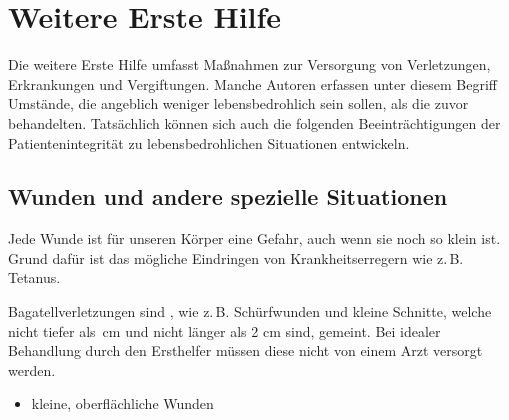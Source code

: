 \section{Weitere Erste Hilfe}

Die weitere Erste Hilfe umfasst Maßnahmen zur Versorgung von
Verletzungen, Erkrankungen und Vergiftungen. Manche Autoren erfassen
unter diesem Begriff Umstände, die
angeblich weniger lebensbedrohlich sein sollen, als die zuvor behandelten. Tatsächlich
können sich auch die folgenden Beeinträchtigungen der
Patientenintegrität zu lebensbedrohlichen Situationen entwickeln. 



\subsection{Wunden und andere spezielle Situationen}
\label{topic:ehi-wunden}


Jede Wunde ist für unseren Körper eine Gefahr, auch wenn sie noch so klein
ist. Grund dafür ist das mögliche Eindringen von Krankheitserregern wie z.\,B.
Tetanus. 

{
Bagatellverletzungen sind , wie z.\,B.
Schürfwunden und kleine Schnitte, welche nicht tiefer als \,cm
und nicht länger als 2 cm sind, gemeint. Bei idealer Behandlung durch
den Ersthelfer müssen diese nicht von einem Arzt versorgt
werden. 
}{
\begin {itemize}
  \item kleine, oberflächliche Wunden
\end{itemize}
}{}{}{}


